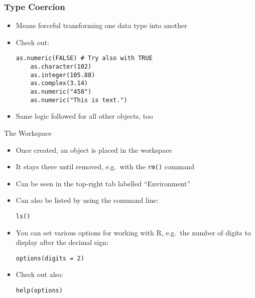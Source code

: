 \documentclass[10pt]{beamer}
\theoremstyle{definition}
\begin{document}
\begin{frame}[fragile]
\frametitle{Type Coercion}
\begin{itemize}
	\item Means forceful transforming one data type into another
	
	\item Check out:
	\begin{lstlisting}[style = rstyle, breaklines]
	as.numeric(FALSE) # Try also with TRUE
	as.character(102)
	as.integer(105.88)
	as.complex(3.14)
	as.numeric("458")
	as.numeric("This is text.")
	\end{lstlisting}

	\item Same logic followed for all other objects, too
\end{itemize}
\end{frame}



\begin{frame}[fragile]{The Workspace}
\begin{itemize}
	\item Once created, an object is placed in the workspace
	
	\item It stays there until removed, e.g.~with the \texttt{rm()} command
	
	\item Can be seen in the top-right tab labelled ``Environment''
	
	\item Can also be listed by using the command line:
	\begin{lstlisting}[style = rstyle, breaklines]
	ls()
	\end{lstlisting}
	
	\item You can set various options for working with R, e.g.~the number of digits to display after the decimal sign:
	\begin{lstlisting}[style = rstyle, breaklines]
	options(digits = 2)
	\end{lstlisting}
	
	\item Check out also:
	\begin{lstlisting}[style = rstyle, breaklines]
	help(options)
	\end{lstlisting}
\end{itemize}
\end{frame}
\end{document}
